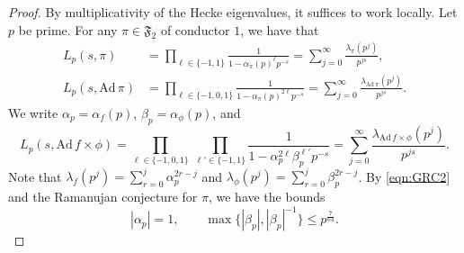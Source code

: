 \documentclass[12pt,reqno]{amsart}
\theoremstyle{remark}
\numberwithin{equation}{section}
\begin{document}
\begin{proof}
By multiplicativity of the Hecke eigenvalues, it suffices to work locally.  Let $p$ be prime.  For any $\pi\in\mathfrak{F}_2$ of conductor $1$, we have that
\begin{align*}
L_p(s,\pi) &= \prod_{\ell\in\{-1,1\}}\frac{1}{1-\alpha_{\pi}(p)^{\ell} p^{-s}}=\sum_{j=0}^{\infty}\frac{\lambda_{\pi}(p^j)}{p^{js}},\\
L_p(s,\mathrm{Ad}\, \pi) &= \prod_{\ell\in\{-1,0,1\}}\frac{1}{1-\alpha_{\pi}(p)^{2\ell} p^{-s}}=\sum_{j=0}^{\infty}\frac{\lambda_{\mathrm{Ad}\, \pi}(p^j)}{p^{js}}.
\end{align*}
We write $\alpha_p = \alpha_{f}(p)$, $\beta_p = \alpha_{\phi}(p)$, and
\[
L_p(s,\mathrm{Ad}\, f \times \phi) = \prod_{\ell \in\{-1,0,1\}}\,\prod_{\ell'\in\{-1,1\}}\frac{1}{1-\alpha_p^{2\ell} \beta_p^{\ell'} p^{-s}}=\sum_{j=0}^{\infty}\frac{\lambda_{\mathrm{Ad}\, f\times\phi}(p^j)}{p^{js}}.
\]
Note that $\lambda_f(p^j)= \sum_{r=0}^j \alpha_p^{2r-j}$ and $\lambda_{\phi}(p^j)= \sum_{r=0}^j \beta_p^{2r-j}$.  By \eqref{eqn:GRC2} and the Ramanujan conjecture for $\pi$, we have the bounds
\begin{equation}
\label{eqn:GRC2}
|\alpha_p|=1,\qquad \max\{|\beta_p|,|\beta_p|^{-1}\}\leq p^{\frac{7}{64}}.
\end{equation}


\end{proof}
\end{document}
